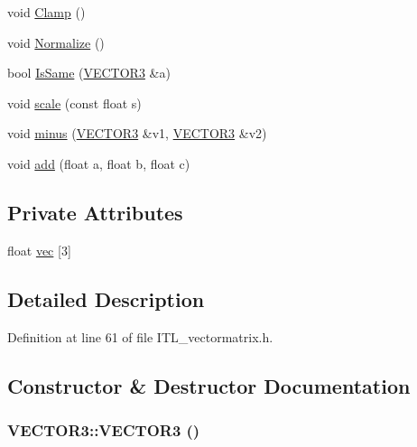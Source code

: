 \begin{DoxyCompactItemize}
\item 
void \hyperlink{classVECTOR3_a5ff1e83937b7cb26817fcb880dd1775e}{Clamp} ()
\item 
void \hyperlink{classVECTOR3_a806c8a5b345ce23d4cadf5b4ed892d2c}{Normalize} ()
\item 
bool \hyperlink{classVECTOR3_a596224f61911d8e49f8a16e4de1752cd}{IsSame} (\hyperlink{classVECTOR3}{VECTOR3} \&a)
\item 
void \hyperlink{classVECTOR3_a7b9d1162d5fd227a4cbbd254839e270c}{scale} (const float s)
\item 
void \hyperlink{classVECTOR3_a3540269e74f969f2d20e6907f495d852}{minus} (\hyperlink{classVECTOR3}{VECTOR3} \&v1, \hyperlink{classVECTOR3}{VECTOR3} \&v2)
\item 
void \hyperlink{classVECTOR3_aa5db49d73f2676c01fb2e11c5ead2f31}{add} (float a, float b, float c)
\end{DoxyCompactItemize}
\subsection*{Private Attributes}
\begin{DoxyCompactItemize}
\item 
float \hyperlink{classVECTOR3_a6550870fd8405ddc131bdb4643940fcd}{vec} \mbox{[}3\mbox{]}
\end{DoxyCompactItemize}


\subsection{Detailed Description}


Definition at line 61 of file ITL\_\-vectormatrix.h.



\subsection{Constructor \& Destructor Documentation}
\hypertarget{classVECTOR3_a67df11517cf0d5f78bc4fbf7c8428c74}{
\subsubsection[{VECTOR3}]{\setlength{\rightskip}{0pt plus 5cm}VECTOR3::VECTOR3 ()}}
\label{classVECTOR3_a67df11517cf0d5f78bc4fbf7c8428c74}


